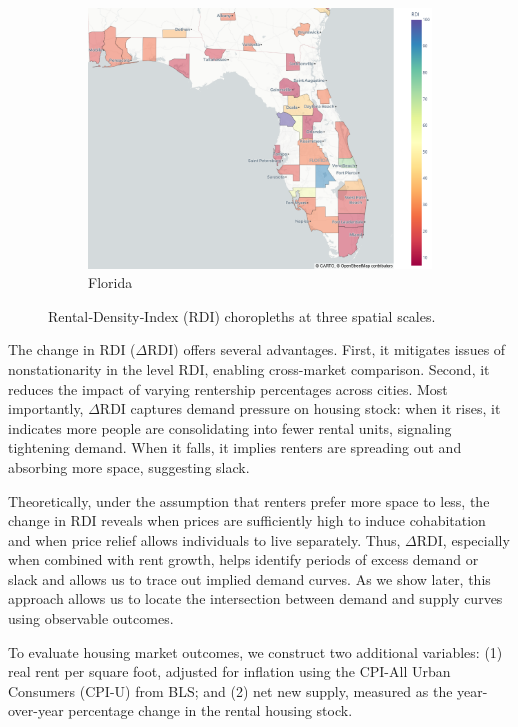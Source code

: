 \documentclass[APA,Times1COL]{WileyNJDv5} %
\begin{document}
\begin{figure}[t]
	\begin{subfigure}[b]{0.32\textwidth}
		\includegraphics[width=\linewidth]{florida.png}
		\caption{Florida}\label{fig:florida_choropleth}
	\end{subfigure}
	
	\caption{Rental‑Density‑Index (RDI) choropleths at three spatial scales.}
	\label{fig:choropleth_panel}
\end{figure}

The change in RDI (\( \Delta \text{RDI} \)) offers several advantages. First, it mitigates issues of nonstationarity in the level RDI, enabling cross-market comparison. Second, it reduces the impact of varying rentership percentages across cities. Most importantly, \( \Delta \text{RDI} \) captures demand pressure on housing stock: when it rises, it indicates more people are consolidating into fewer rental units, signaling tightening demand. When it falls, it implies renters are spreading out and absorbing more space, suggesting slack.

Theoretically, under the assumption that renters prefer more space to less, the change in RDI reveals when prices are sufficiently high to induce cohabitation and when price relief allows individuals to live separately. Thus, \( \Delta \text{RDI} \), especially when combined with rent growth, helps identify periods of excess demand or slack and allows us to trace out implied demand curves. As we show later, this approach allows us to locate the intersection between demand and supply curves using observable outcomes.

To evaluate housing market outcomes, we construct two additional variables: (1) real rent per square foot, adjusted for inflation using the CPI-All Urban Consumers (CPI-U) from BLS; and (2) net new supply, measured as the year-over-year percentage change in the rental housing stock.
\end{document}
